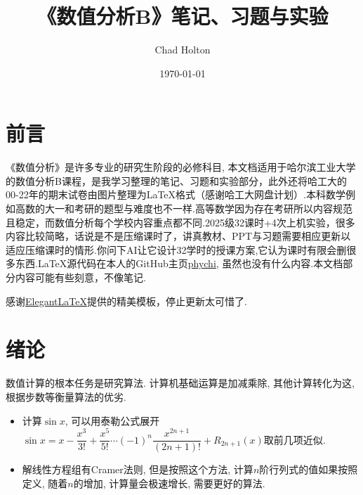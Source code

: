 \documentclass[lang=cn,newtx,12pt,scheme=chinese]{elegantbook}
\title{《数值分析B》笔记、习题与实验}
\author{Chad Holton}
\institute{哈尔滨工业大学能源科学与工程学院}
\date{\today}
\begin{document}
\maketitle
\frontmatter

\tableofcontents

\mainmatter
\chapter*{前言}
《数值分析》是许多专业的研究生阶段的必修科目, 本文档适用于哈尔滨工业大学的数值分析B课程，是我学习整理的笔记、习题和实验部分，此外还将哈工大的00-22年的期末试卷由图片整理为\LaTeX 格式（感谢哈工大网盘计划）.本科数学例如高数的大一和考研的题型与难度也不一样.高等数学因为存在考研所以内容规范且稳定，而数值分析每个学校内容重点都不同.2025级32课时+4次上机实验，很多内容比较简略，话说是不是压缩课时了，讲真教材、PPT与习题需要相应更新以适应压缩课时的情形.你问下AI让它设计32学时的授课方案,它认为课时有限会删很多东西.\LaTeX 源代码在本人的GitHub主页\href{https://github.com/phychi}{phychi}, 虽然也没有什么内容.本文档部分内容可能有些刻意，不像笔记.

感谢\href{https://github.com/ElegantLaTeX}{ElegantLaTeX}提供的精美模板，停止更新太可惜了.
\chapter{绪论}
数值计算的根本任务是研究算法. 计算机基础运算是加减乘除, 其他计算转化为这, 根据步数等衡量算法的优劣.
\begin{itemize}
	\item 计算$\sin x$, 可以用泰勒公式展开$\sin x=x-\dfrac{x^3}{3!}+\dfrac{x^5}{5!}\cdots(-1)^n\dfrac{x^{2n+1}}{(2n+1)!}+R_{2n+1}(x)$取前几项近似.
	\item 解线性方程组有Cramer法则, 但是按照这个方法, 计算$n$阶行列式的值如果按照定义, 随着$n$的增加, 计算量会极速增长, 需要更好的算法.
\end{itemize}
\end{document}
